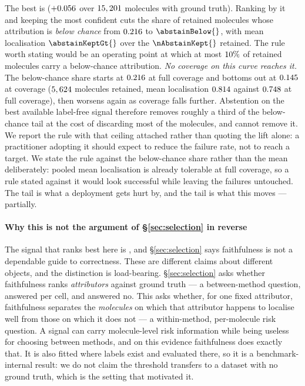 The best is \abstainBest{} ($+0.056{}$ over
$15,201{}$ molecules with ground truth).
\ifHasAbstainOp
Ranking by it and keeping the most confident \abstainCoverage{} cuts the share
of retained molecules whose attribution is \emph{below chance} from
$0.216{}$ to $\abstainBelow{}$, with mean localisation
$\abstainKeptGt{}$ over the $\nAbstainKept{}$ retained.
\else
The rule worth stating would be an operating point at which at most
$10\%{}$ of retained molecules carry a below-chance attribution.
\emph{No coverage on this curve reaches it.}\ifHasAbstainFloor{} The below-chance share starts at
$0.216{}$ at full coverage and bottoms out at
$0.145{}$ at \abstainFloorCoverage{} coverage
($5,624{}$ molecules retained, mean localisation
$0.814{}$ against $0.748{}$ at full coverage), then
worsens again as coverage falls further\fi{}. Abstention on the best available
label-free signal therefore removes roughly a third of the below-chance tail at
the cost of discarding most of the molecules, and cannot remove it. We report
the rule with that ceiling attached rather than quoting the lift alone: a
practitioner adopting it should expect to reduce the failure rate, not to reach
a target.
\fi
We state the rule against the below-chance share rather than the mean
deliberately: pooled mean localisation is already tolerable at full coverage,
so a rule stated against it would look successful while leaving the failures
untouched. The tail is what a deployment gets hurt by, and the tail is what
this moves --- partially.

\paragraph{Why this is not the argument of \S\ref{sec:selection} in reverse}
The signal that ranks best here is \abstainBest{}, and \S\ref{sec:selection}
says faithfulness is not a dependable guide to correctness. These are different
claims about different objects, and the distinction is load-bearing.
\S\ref{sec:selection} asks whether faithfulness ranks \emph{attributors}
against ground truth --- a between-method question, answered per cell, and
answered no. This asks whether, for one fixed attributor, faithfulness
separates the \emph{molecules} on which that attributor happens to localise
well from those on which it does not --- a within-method, per-molecule risk
question. A signal can carry molecule-level risk information while being
useless for choosing between methods, and on this evidence faithfulness does
exactly that. It is also fitted where labels exist and evaluated there, so it
is a benchmark-internal result: we do not claim the threshold transfers to a
dataset with no ground truth, which is the setting that motivated it.

